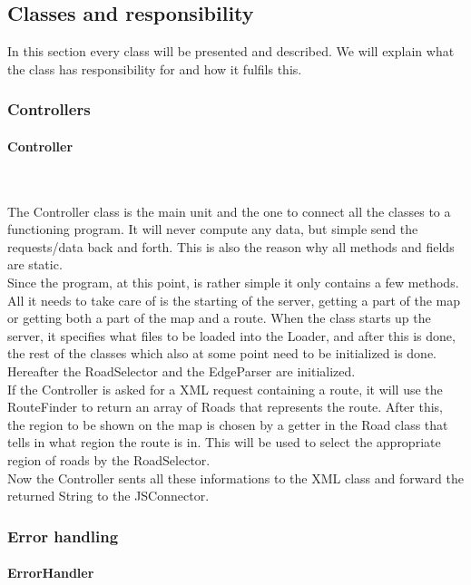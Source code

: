 \documentclass[a4paper,10pt,titlepage]{article}
\begin{document}
		\newpage
		\subsection{Classes and responsibility}
		In this section every class will be presented and described. We will explain what the class has responsibility  for and how it fulfils this. 
			
			\subsubsection{Controllers}
			
				\paragraph{Controller}\mbox{}\
				
The Controller class is the main unit and the one to connect all the classes to a functioning program. It will never compute any data, but simple send the requests/data back and forth.  This is also the reason why all methods and fields are static.\\
Since the program, at this point, is rather simple it only contains a few methods. All it needs to take care of is the starting of the server, getting a part of the map or getting both a part of the map and a route. When the class starts up the server, it specifies what files to be loaded into the Loader, and after this is done, the rest of the classes which also at some point need to be initialized is done. Hereafter the RoadSelector and the EdgeParser are initialized.\\
If the Controller is asked for a XML request containing a route, it will use the RouteFinder to return an array of Roads that represents the route. After this, the region to be shown on the map is chosen by a getter in the Road class that tells in what region the route is in. This will be used to select the appropriate region of roads by the RoadSelector.\\
Now the Controller sents all these informations to the XML class and forward the returned String to the JSConnector.\\


					
			\subsubsection{Error handling}
				
				\paragraph{ErrorHandler}\mbox{}\
\end{document}
